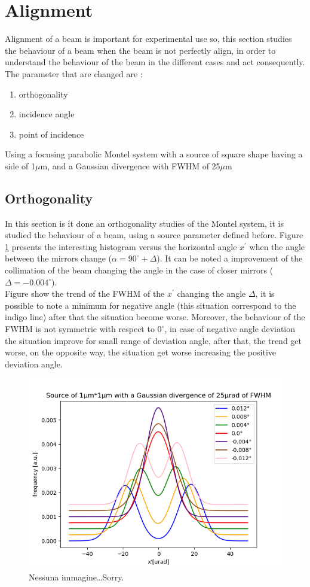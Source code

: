 \section{Alignment}
Alignment of a beam is important for experimental use so, this section studies the behaviour of a beam when the beam is not perfectly align, in order to understand the behaviour of the beam in the different cases and act consequently. 
\\
The parameter that are changed are :
\begin{enumerate}
	\item orthogonality
	\item incidence angle
	\item point of incidence
\end{enumerate}
Using a focusing parabolic Montel system with a source of square shape having a side of 1$\mu $m, and a Gaussian divergence with FWHM of 25$\mu $m

\subsection{Orthogonality}
In this section is it done an orthogonality studies of the Montel system, it is studied the behaviour of a beam, using a source parameter defined before. Figure \ref{fig:HistogramFitted} presents the interesting histogram versus the horizontal angle $x^{'} $ when the angle between the mirrors change ($\alpha = 90^{\circ} + \Delta $). It can be noted a improvement of the collimation of the beam changing the angle in the case of closer mirrors ($\Delta = -0.004^{\circ} $).
\\
Figure show the trend of the FWHM of the $x^{'} $ changing the angle $\Delta $, it is possible to note a minimum for negative angle (this  situation correspond to the indigo line) after that the situation become worse. Moreover, the behaviour of the FWHM is not symmetric with respect to $0^{\circ} $, in case of negative angle deviation the situation improve for small range of deviation angle, after that, the trend get worse, on the opposite way, the situation get worse increasing the positive deviation angle. 

\begin{figure}
%
\centering
%
\includegraphics[width=.6\textwidth]{Immagini/Chapter5/HistogramFitted}
%
\caption{Nessuna immagine\dots Sorry.}
%
\label{fig:HistogramFitted}
%
\end{figure}

